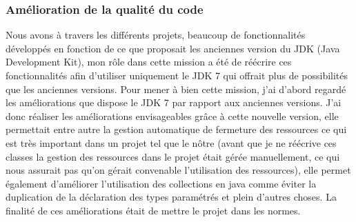 \documentclass[12pt,a4paper]{report}
\begin{document}
\subsubsection{Amélioration de la qualité du code}
Nous avons à travers les différents projets, beaucoup de fonctionnalités développés en fonction de ce que proposait les anciennes version du JDK (Java Development Kit), mon rôle dans cette mission a été de réécrire ces fonctionnalités afin  d'utiliser uniquement le JDK 7 qui offrait plus de possibilités que les anciennes versions. Pour mener à bien cette mission, j'ai d'abord regardé les améliorations que dispose le JDK 7 par rapport aux anciennes versions. J'ai donc réaliser les améliorations envisageables grâce à cette nouvelle version, elle permettait entre autre la gestion automatique de fermeture des ressources ce qui est très important dans un projet tel que le nôtre (avant que je ne réécrive ces classes la gestion des ressources dans le projet était gérée  manuellement, ce qui nous assurait pas qu'on gérait convenable l'utilisation des ressources), elle permet également d'améliorer l'utilisation des collections en java comme éviter la duplication de la déclaration des types paramétrés et plein d'autres choses. La finalité de ces améliorations était de mettre le projet dans les normes.
\end{document}
